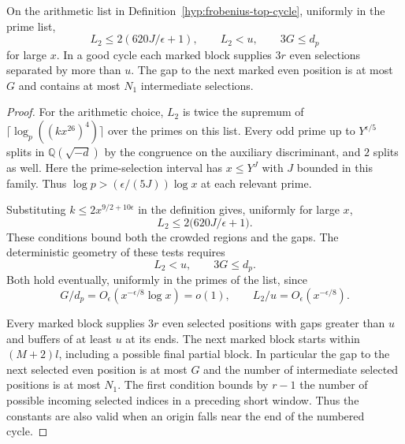 \begin{auxlemma}
\label{lem:cycle-geometric-margins}
On the arithmetic list in Definition~\ref{hyp:frobenius-top-cycle}, uniformly in the prime list,
\[
 L_2\le 2(620J/\epsilon+1),\qquad L_2<u,\qquad 3G\le d_p
\]
for large \(x\). In a good cycle each marked block supplies \(3r\) even selections separated by more than \(u\). The gap to the next marked even position is at most \(G\) and contains at most \(N_1\) intermediate selections.
\end{auxlemma}
\begin{proof}
For the arithmetic choice,
\(L_2\) is twice the supremum of
\(\lceil\log_p((kx^{26})^4)\rceil\) over the primes on this list. Every odd prime up to \(Y^{\epsilon/5}\)
splits in \(\mathbb Q(\sqrt{-d})\) by the congruence on
the auxiliary discriminant, and \(2\) splits as well.
Here the prime-selection interval has \(x\le Y^J\)
with \(J\) bounded in this family. Thus \(\log p>(\epsilon/(5J))\log x\) at each relevant prime.

Substituting \(k\le2x^{9/2+10\epsilon}\) in the definition gives, uniformly for large \(x\),
\[
 L_2\le 2\bigl(620J/\epsilon+1\bigr).
\]
These conditions bound both the crowded regions and the gaps.
The deterministic geometry of these tests requires
\[
 L_2<u,\qquad 3G\le d_p.
\]
Both hold eventually, uniformly in the primes of the list, since
\[
 G/d_p=O_\epsilon(x^{-\epsilon/8}\log x)=o(1),\qquad L_2/u=O_\epsilon(x^{-\epsilon/8}).
\]

Every marked block supplies \(3r\) even selected positions
with gaps greater than \(u\) and buffers of at least \(u\)
at its ends. The next marked block starts within \((M+2)l\),
including a possible final partial block. In particular the
gap to the next selected even position is at most \(G\) and
the number of intermediate selected positions is at most
\(N_1\). The first condition bounds by \(r-1\) the number
of possible incoming selected indices in a preceding short
window. Thus the constants are also valid when an origin
falls near the end of the numbered cycle.

\end{proof}

